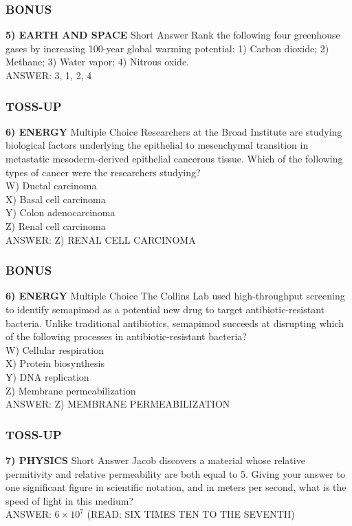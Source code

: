 \subsubsection*{BONUS}
\textbf{5) EARTH AND SPACE}
Short Answer Rank the following four greenhouse gases by increasing 100-year global warming potential: 1) Carbon dioxide; 2) Methane; 3) Water vapor; 4) Nitrous oxide.
\\ANSWER: 3, 1, 2, 4

\newpage

\subsubsection*{TOSS-UP}
\textbf{6) ENERGY}
Multiple Choice Researchers at the Broad Institute are studying biological factors underlying the epithelial to mesenchymal transition in metastatic mesoderm-derived epithelial cancerous tissue. Which of the following types of cancer were the researchers studying?
\\W) Ductal carcinoma
\\X) Basal cell carcinoma
\\Y) Colon adenocarcinoma
\\Z) Renal cell carcinoma
\\ANSWER: Z) RENAL CELL CARCINOMA

\subsubsection*{BONUS}
\textbf{6) ENERGY}
Multiple Choice The Collins Lab used high-throughput screening to identify semapimod as a potential new drug to target antibiotic-resistant bacteria. Unlike traditional antibiotics, semapimod succeeds at disrupting which of the following processes in antibiotic-resistant bacteria?
\\W) Cellular respiration
\\X) Protein biosynthesis
\\Y) DNA replication
\\Z) Membrane permeabilization
\\ANSWER: Z) MEMBRANE PERMEABILIZATION

\subsubsection*{TOSS-UP}
\textbf{7) PHYSICS}
Short Answer Jacob discovers a material whose relative permitivity and relative permeability are both equal to 5. Giving your answer to one significant figure in scientific notation, and in meters per second, what is the speed of light in this medium?
\\ANSWER: $6\times10^{7}$ (READ: SIX TIMES TEN TO THE SEVENTH)

